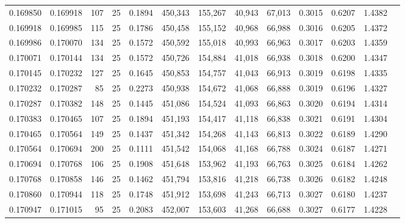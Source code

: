 \begin{tabular}{rrrrrrrrrrrrr}
0.169850 & 0.169918 &   107 &  25 &                                     0.1894 & 450,343 & 155,267 &  40,943 &  67,013 & 0.3015 & 0.6207 & 1.4382 \\
0.169918 & 0.169985 &   115 &  25 &                                     0.1786 & 450,458 & 155,152 &  40,968 &  66,988 & 0.3016 & 0.6205 & 1.4372 \\
0.169986 & 0.170070 &   134 &  25 &                                     0.1572 & 450,592 & 155,018 &  40,993 &  66,963 & 0.3017 & 0.6203 & 1.4359 \\
0.170071 & 0.170144 &   134 &  25 &                                     0.1572 & 450,726 & 154,884 &  41,018 &  66,938 & 0.3018 & 0.6200 & 1.4347 \\
0.170145 & 0.170232 &   127 &  25 &                                     0.1645 & 450,853 & 154,757 &  41,043 &  66,913 & 0.3019 & 0.6198 & 1.4335 \\
0.170232 & 0.170287 &    85 &  25 &                                     0.2273 & 450,938 & 154,672 &  41,068 &  66,888 & 0.3019 & 0.6196 & 1.4327 \\
0.170287 & 0.170382 &   148 &  25 &                                     0.1445 & 451,086 & 154,524 &  41,093 &  66,863 & 0.3020 & 0.6194 & 1.4314 \\
0.170383 & 0.170465 &   107 &  25 &                                     0.1894 & 451,193 & 154,417 &  41,118 &  66,838 & 0.3021 & 0.6191 & 1.4304 \\
0.170465 & 0.170564 &   149 &  25 &                                     0.1437 & 451,342 & 154,268 &  41,143 &  66,813 & 0.3022 & 0.6189 & 1.4290 \\
0.170564 & 0.170694 &   200 &  25 &                                     0.1111 & 451,542 & 154,068 &  41,168 &  66,788 & 0.3024 & 0.6187 & 1.4271 \\
0.170694 & 0.170768 &   106 &  25 &                                     0.1908 & 451,648 & 153,962 &  41,193 &  66,763 & 0.3025 & 0.6184 & 1.4262 \\
0.170768 & 0.170858 &   146 &  25 &                                     0.1462 & 451,794 & 153,816 &  41,218 &  66,738 & 0.3026 & 0.6182 & 1.4248 \\
0.170860 & 0.170944 &   118 &  25 &                                     0.1748 & 451,912 & 153,698 &  41,243 &  66,713 & 0.3027 & 0.6180 & 1.4237 \\
0.170947 & 0.171015 &    95 &  25 &                                     0.2083 & 452,007 & 153,603 &  41,268 &  66,688 & 0.3027 & 0.6177 & 1.4228 \\

\end{tabular}
